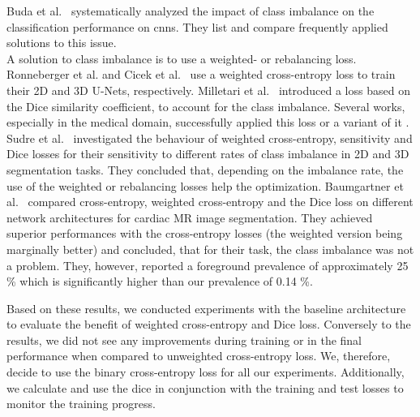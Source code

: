 Buda et al.~\cite{BudaANetworks} systematically analyzed the impact of class imbalance on the classification performance on \acrshort{cnn}s. They list and compare frequently applied solutions to this issue.\\
A solution to class imbalance is to use a weighted- or rebalancing loss. Ronneberger et al. \cite{Ronneberger2015U-Net:Segmentation} and Cicek et al.~\cite{Cicek20163DAnnotation} use a weighted cross-entropy loss to train their 2D and 3D U-Nets, respectively. Milletari et al.~\cite{Milletari2016V-Net:Segmentation} introduced a loss based on the Dice similarity coefficient, to account for the class imbalance. Several works, especially in the medical domain, successfully applied this loss or a variant of it \cite{Selvan2018ExtractionNetworks,Kayalibay2017CNN-basedData,Drozdzal2016TheSegmentation}. Sudre et al.~\cite{Sudre2017GeneralisedSegmentations} investigated the behaviour of weighted cross-entropy, sensitivity and Dice losses for their sensitivity to different rates of class imbalance in 2D and 3D segmentation tasks. They concluded that, depending on the imbalance rate, the use of the weighted or rebalancing losses help the optimization. Baumgartner et al.~\cite{Baumgartner2017AnSegmentation} compared cross-entropy, weighted cross-entropy and the Dice loss on different network architectures for cardiac MR image segmentation. They achieved superior performances with the cross-entropy losses (the weighted version being marginally better) and concluded, that for their task, the class imbalance was not a problem. They, however, reported a foreground prevalence of approximately 25 \% which is significantly higher than our prevalence of 0.14 \%.

Based on these results, we conducted experiments with the baseline architecture to evaluate the benefit of weighted cross-entropy and Dice loss. Conversely to the results, we did not see any improvements during training or in the final performance when compared to unweighted cross-entropy loss. We, therefore, decide to use the binary cross-entropy loss for all our experiments. Additionally, we calculate and use the \acrlong{dice} in conjunction with the training and test losses to monitor the training progress.

